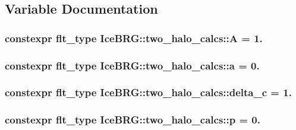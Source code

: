 \subsection{Variable Documentation}
\hypertarget{namespaceIceBRG_1_1two__halo__calcs_aa6c7287a1d42b243ed38f946af0bf536}{}
\subsubsection[{A}]{\setlength{\rightskip}{0pt plus 5cm}constexpr {\bf flt\+\_\+type} Ice\+B\+R\+G\+::two\+\_\+halo\+\_\+calcs\+::\+A = 1.}\label{namespaceIceBRG_1_1two__halo__calcs_aa6c7287a1d42b243ed38f946af0bf536}
\hypertarget{namespaceIceBRG_1_1two__halo__calcs_abb15800ff1ecc6d29d6a649319841b43}{}
\subsubsection[{a}]{\setlength{\rightskip}{0pt plus 5cm}constexpr {\bf flt\+\_\+type} Ice\+B\+R\+G\+::two\+\_\+halo\+\_\+calcs\+::a = 0.}\label{namespaceIceBRG_1_1two__halo__calcs_abb15800ff1ecc6d29d6a649319841b43}
\hypertarget{namespaceIceBRG_1_1two__halo__calcs_a5727ff5d6c87da669194d3380408ca41}{}
\subsubsection[{delta\+\_\+c}]{\setlength{\rightskip}{0pt plus 5cm}constexpr {\bf flt\+\_\+type} Ice\+B\+R\+G\+::two\+\_\+halo\+\_\+calcs\+::delta\+\_\+c = 1.}\label{namespaceIceBRG_1_1two__halo__calcs_a5727ff5d6c87da669194d3380408ca41}
\hypertarget{namespaceIceBRG_1_1two__halo__calcs_a4bc1d5f20184d2fedf74f7cf76bd83d1}{}
\subsubsection[{p}]{\setlength{\rightskip}{0pt plus 5cm}constexpr {\bf flt\+\_\+type} Ice\+B\+R\+G\+::two\+\_\+halo\+\_\+calcs\+::p = 0.}\label{namespaceIceBRG_1_1two__halo__calcs_a4bc1d5f20184d2fedf74f7cf76bd83d1}
